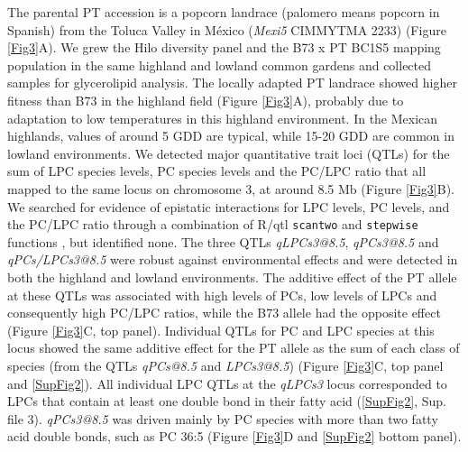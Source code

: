 \documentclass[9pt,twocolumn,twoside,lineno]{biorxiv}
\def\code#1{\texttt{#1}}
\begin{document}
The parental PT accession is a popcorn landrace (palomero means popcorn in Spanish) from the Toluca Valley in México (\textit{Mexi5} CIMMYTMA 2233) (Figure \ref{Fig3}A). 
We grew the Hilo diversity panel and the B73 x PT BC1S5 mapping population in the same highland and lowland common gardens and collected samples for glycerolipid analysis.
The locally adapted PT landrace showed higher fitness than B73 in the highland field (Figure \ref{Fig3}A), probably due to adaptation to low temperatures in this highland environment.  
In the Mexican highlands, values of around 5 GDD are typical, while 15-20 GDD are common in lowland environments. 
We detected major quantitative trait loci (QTLs) for the sum of LPC species levels, PC species levels and the PC/LPC ratio that all mapped to the same locus on chromosome 3, at around 8.5 Mb (Figure \ref{Fig3}B). 
We searched for evidence of epistatic interactions for LPC levels, PC levels, and the PC/LPC ratio through a combination of R/qtl \code{scantwo} and \code{stepwise} functions \cite{Broman2003-ac}, but identified none.
The three QTLs \textit{qLPCs3@8.5}, \textit{qPCs3@8.5} and \textit{qPCs/LPCs3@8.5} were robust against environmental effects and were detected in both the highland and lowland environments.
The additive effect of the PT allele at these QTLs was associated with high levels of PCs, low levels of LPCs and consequently high PC/LPC ratios, while the B73 allele had the opposite effect (Figure \ref{Fig3}C, top panel).
Individual QTLs for PC and LPC species at this locus showed the same additive effect for the PT allele as the sum of each class of species (from the QTLs \textit{qPCs@8.5} and \textit{LPCs3@8.5}) (Figure \ref{Fig3}C, top panel and \ref{SupFig2}). 
All individual LPC QTLs at the \textit{qLPCs3} locus corresponded to LPCs that contain at least one double bond in their fatty acid (\ref{SupFig2}, Sup. file 3).
\textit{qPCs3@8.5} was driven mainly by PC species with more than two fatty acid double bonds, such as PC 36:5 (Figure \ref{Fig3}D and \ref{SupFig2} bottom panel).
\end{document}
